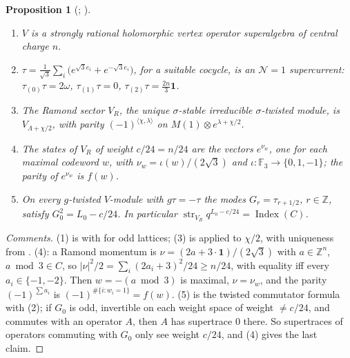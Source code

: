 \documentclass[11pt]{amsart}
\newtheorem{proposition}[theorem]{Proposition}
\theoremstyle{definition}
\newcommand{\F}{\mathbb{F}_3}
\newcommand{\Z}{\mathbb{Z}}
\newcommand{\cN}{\mathcal N}
\newcommand{\Index}{\operatorname{Index}}
\newcommand{\str}{\operatorname{str}}
\begin{document}
\begin{proposition}[{\cite[\S2, Prop.~2.4]{GJF}; \cite{BK,Li,DZ}}]\label{prop:VC}
\begin{enumerate}
\item $V$ is a strongly rational holomorphic vertex operator superalgebra of central charge $n$.
\item $\tau=\tfrac1{\sqrt3}\sum_i\bigl(e^{\sqrt3e_i}+e^{-\sqrt3e_i}\bigr)$, for a suitable cocycle, is an
  $\cN=1$ supercurrent: $\tau_{(0)}\tau=2\omega$, $\tau_{(1)}\tau=0$, $\tau_{(2)}\tau=\tfrac{2n}3\mathbf 1$.
\item The Ramond sector $V_R$, the unique $\sigma$-stable irreducible $\sigma$-twisted module, is
  $V_{\Lambda+\chi/2}$, with parity $(-1)^{\langle\chi,\lambda\rangle}$ on $M(1)\otimes e^{\lambda+\chi/2}$.
\item The states of $V_R$ of weight $c/24=n/24$ are the vectors $e^{\nu_w}$, one for each maximal
  codeword $w$, with $\nu_w=\iota(w)/(2\sqrt3)$ and $\iota\colon\F\to\{0,1,-1\}$; the parity of
  $e^{\nu_w}$ is $f(w)$.
\item On every $g$-twisted $V$-module with $g\tau=-\tau$ the modes $G_r=\tau_{r+1/2}$, $r\in\Z$, satisfy
  $G_0^2=L_0-c/24$. In particular $\str_{V_R}q^{L_0-c/24}=\Index(C)$.
\end{enumerate}
\end{proposition}

\begin{proof}[Comments]
(1) is \cite[\S2]{GJF} with \cite[Thm.~4.1]{BK} for odd lattices; (3) is \cite[Prop.~5.4]{Li} applied
to $\chi/2$, with uniqueness from \cite[Thm.~7.7]{DZ}. (4): a Ramond momentum is
$\nu=(2a+3\cdot\mathbf 1)/(2\sqrt3)$ with $a\in\Z^n$, $a\bmod3\in C$, so
$|\nu|^2/2=\sum_i(2a_i+3)^2/24\ge n/24$, with equality iff every $a_i\in\{-1,-2\}$. Then $w=-(a\bmod3)$ is
maximal, $\nu=\nu_w$, and the parity $(-1)^{\sum a_i}$ is $(-1)^{\#\{i:w_i=1\}}=f(w)$. (5) is the
twisted commutator formula \cite[(M4)]{Li} with (2); if $G_0$ is odd, invertible on each weight space
of weight $\ne c/24$, and commutes with an operator $A$, then $A$ has supertrace $0$ there. So
supertraces of operators commuting with $G_0$ only see weight $c/24$, and (4) gives the last claim.
\end{proof}
\end{document}
